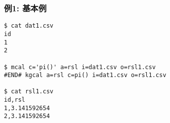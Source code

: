 
\subsubsection*{例1: 基本例}


\begin{Verbatim}[baselinestretch=0.7,frame=single]
$ cat dat1.csv
id
1
2

$ mcal c='pi()' a=rsl i=dat1.csv o=rsl1.csv
#END# kgcal a=rsl c=pi() i=dat1.csv o=rsl1.csv

$ cat rsl1.csv
id,rsl
1,3.141592654
2,3.141592654
\end{Verbatim}
